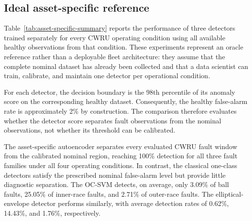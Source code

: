 \documentclass[11pt,a4paper]{article}
\begin{document}
\subsection{Ideal asset-specific reference}
\label{sec:oracle-results}

Table~\ref{tab:asset-specific-summary} reports the performance of three detectors trained
separately for every CWRU operating condition using all available healthy observations from that
condition. These experiments represent an oracle reference rather than a deployable fleet
architecture: they assume that the complete nominal dataset has already been collected and that a
data scientist can train, calibrate, and maintain one detector per operational condition.

For each detector, the decision boundary is the 98th percentile of its anomaly score on the
corresponding healthy dataset. Consequently, the healthy false-alarm rate is approximately
2\% by construction. The comparison therefore evaluates whether the detector score separates
fault observations from the nominal observations, not whether its threshold can be calibrated.

\begin{table}[H]
\centering
\caption{Ideal asset-specific detector performance on CWRU. Values are mean
$\pm$ standard deviation across the four operating conditions. Each detector is trained and
calibrated separately using the complete healthy dataset of the corresponding condition.}
\label{tab:asset-specific-summary}
\end{table}

The asset-specific autoencoder separates every evaluated CWRU fault window from the calibrated
nominal region, reaching 100\% detection for all three fault families under all four operating
conditions. In contrast, the classical one-class detectors satisfy the prescribed nominal
false-alarm level but provide little diagnostic separation. The OC-SVM detects, on average,
only 3.09\% of ball faults, 25.05\% of inner-race faults, and 2.71\% of outer-race
faults. The elliptical-envelope detector performs similarly, with average detection rates of
0.62\%, 14.43\%, and 1.76\%, respectively.
\end{document}

